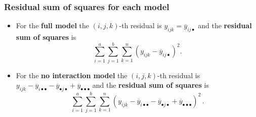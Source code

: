 \documentclass[a4paper]{article}\usepackage[]{graphicx}\usepackage[]{xcolor}
\begin{document}
\subsubsection{Residual sum of squares for each model}
\begin{itemize}
	\item For the \textbf{full model} the \( (i,j,k) \)-th residual is \( y_{ijk} = \overline{y}_{ij\bullet} \) and the \textbf{residual sum of squares} is
	\[
		\sum_{i=1}^a\sum_{j=1}^b\sum_{k=1}^n \left( y_{ijk}-\overline y_{ij\bullet} \right)^2.
	\]
	\item For the \textbf{no interaction model} the \( (i,j,k) \)-th residual is \( y_{ijk}-\overline y_{i\bullet\bullet}-\overline y_{\bullet j\bullet}+\overline y_{\bullet\bullet\bullet} \) and the \textbf{residual sum of squares} is
	\[
		\sum_{i=1}^a\sum_{j=1}^b\sum_{k=1}^n \left( y_{ijk}-\overline y_{i\bullet\bullet}-\overline y_{\bullet j\bullet}+\overline y_{\bullet\bullet\bullet} \right)^2\,.
	\]
\end{itemize}
\end{document}
